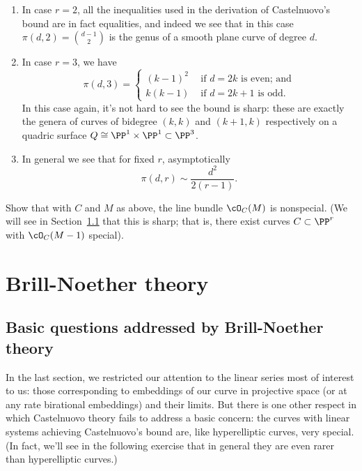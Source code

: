 %

\begin{enumerate}
\item In case $r=2$, all the inequalities used in the derivation of Castelnuovo's bound are in fact equalities, and indeed we see that in this case $\pi(d,2) = \binom{d-1}{2}$ is the genus of a smooth plane curve of degree $d$.

\item In case $r=3$, we have
$$
\pi(d,3) =
\begin{cases}
\left( k - 1 \right)^2 &\text{ if $d=2k$ is even; and} \\
k(k-1) &\text{ if $d=2k+1$ is odd.}
\end{cases}
$$
In this case again, it's not hard to see the bound is sharp: these are exactly the genera of curves of bidegree $(k,k)$ and $(k+1,k)$ respectively on a quadric surface $Q \cong \PP^1 \times \PP^1 \subset \PP^3$.
\item In general we see that for fixed $r$, asymptotically
$$
\pi(d,r) \sim \frac{d^2}{2(r-1)}.
$$
\end{enumerate}


\begin{exercise}
Show that with $C$ and $M$ as above, the line bundle $\cO_C(M)$ is nonspecial. (We will see in Section~\ref{} that this is sharp; that is, there exist curves $C \subset \PP^r$ with $\cO_C(M-1)$ special).
\end{exercise}


\section{Brill-Noether theory}

\subsection{Basic questions addressed by Brill-Noether theory}

In the last section, we restricted our attention to the linear series most of interest to us: those corresponding to embeddings of our curve in projective space (or at any rate birational embeddings) and their limits. But there is one other respect in which Castelnuovo theory fails to address a basic concern: the curves with linear systems achieving Castelnuovo's bound are, like hyperelliptic curves, very special. (In fact, we'll see in the following exercise that in general they are even rarer than hyperelliptic curves.) 

